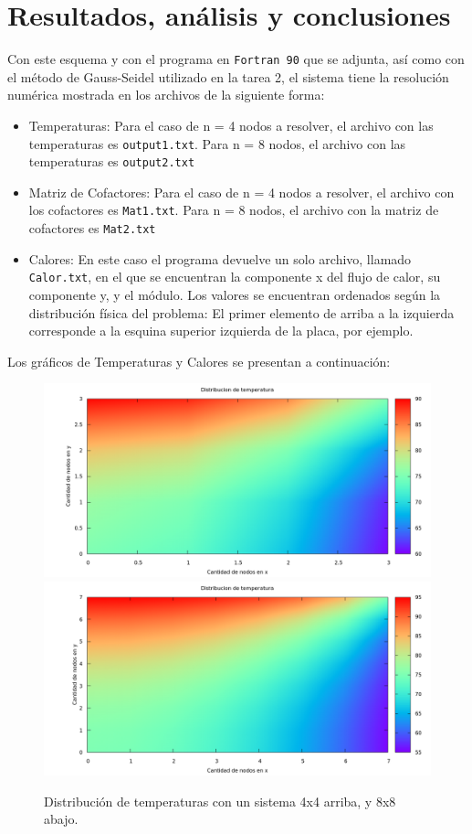 \documentclass[12pt, notitlepage]{article}
\begin{document}
\section{Resultados, análisis y conclusiones}
Con este esquema y con el programa en \texttt{Fortran 90} que se adjunta, así como con el método de Gauss-Seidel utilizado en la tarea 2, el sistema tiene la resolución numérica mostrada en los archivos de la siguiente forma:
\begin{itemize}
\item{Temperaturas: Para el caso de n = 4 nodos a resolver, el archivo con las temperaturas es \texttt{output1.txt}. Para n = 8 nodos, el archivo con las temperaturas es \texttt{output2.txt}}
\item{Matriz de Cofactores: Para el caso de n = 4 nodos a resolver, el archivo con los cofactores es \texttt{Mat1.txt}. Para n = 8 nodos, el archivo con la matriz de cofactores es \texttt{Mat2.txt}}
\item{Calores: En este caso el programa devuelve un solo archivo, llamado \texttt{Calor.txt}, en el que se encuentran la componente x del flujo de calor, su componente y, y el módulo. Los valores se encuentran ordenados según la distribución física del problema: El primer elemento de arriba a la izquierda corresponde a la esquina superior izquierda de la placa, por ejemplo.}
\end{itemize}

Los gráficos de Temperaturas y Calores se presentan a continuación:

\begin{figure}[H]
\centering
\includegraphics[scale=0.3]{4x4.png}
\includegraphics[scale=0.3]{8x8.png}
\caption{Distribución de temperaturas con un sistema 4x4 arriba, y 8x8 abajo.}
\end{figure}
\end{document}
